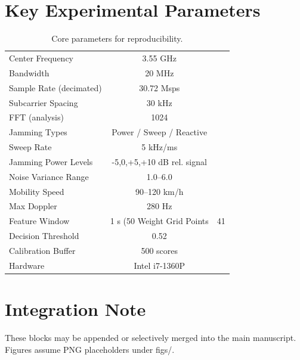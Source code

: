 \section{Key Experimental Parameters}
\begin{table}[h]
  \centering
  \renewcommand{\arraystretch}{1.05}
  \setlength{\tabcolsep}{5pt}
  \begin{tabular}{|l|c|}
    \hline
    Center Frequency & 3.55 GHz \\
    Bandwidth & 20 MHz \\
    Sample Rate (decimated) & 30.72 Msps \\
    Subcarrier Spacing & 30 kHz \\
    FFT (analysis) & 1024 \\
    Jamming Types & Power / Sweep / Reactive \\
    Sweep Rate & 5 kHz/ms \\
    Jamming Power Levels & {-5,0,+5,+10} dB rel. signal \\
    Noise Variance Range & 1.0--6.0 \\
    Mobility Speed & 90--120 km/h \\
    Max Doppler & 280 Hz \\
    Feature Window & 1 s (50%
    Weight Grid Points & 41 \\
    Decision Threshold & 0.52 \\
    Calibration Buffer & 500 scores \\
    Hardware & Intel i7-1360P \\
    \hline
  \end{tabular}
  \caption{Core parameters for reproducibility.}
\end{table}

\section{Integration Note}
These blocks may be appended or selectively merged into the main manuscript. Figures assume PNG placeholders under figs/.

